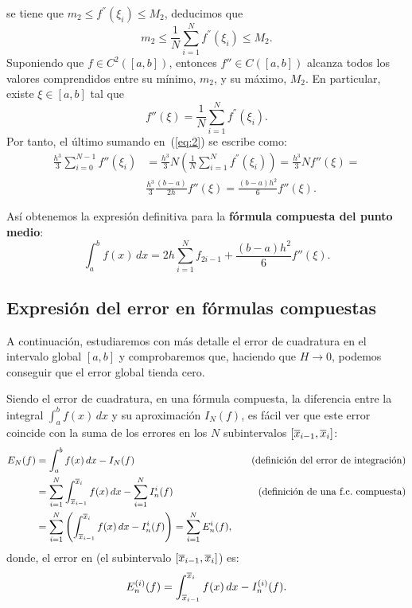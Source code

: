 \begin{example}
  se tiene que $m_2\le f^{''}(\xi_i)\le M_2$, deducimos que
  $$
  m_2 \le \frac 1N \sum_{i=1}^Nf^{''}(\xi_i) \le M_2.
  $$
  Suponiendo que $f\in C^2([a,b])$, entonces $f''\in C([a,b])$
  alcanza todos los valores comprendidos entre su mínimo, $m_2$,
  y su máximo, $M_2$. En particular, existe $\xi\in[a,b]$ tal que
  $$
  f''(\xi) = \frac 1N \sum_{i=1}^Nf^{''}(\xi_i).
  $$
  Por tanto, el último sumando en~(\ref{eq:2}) se escribe como:
  \begin{align*}
  \frac{h^3}{3} \sum_{i=0}^{N-1}f''(\xi_i) &= \frac{h^3}{3} N \left( \frac 1N
  \sum_{i=1}^Nf^{''}(\xi_i) \right)=
    \frac{h^3}{3}N
  f''(\xi)=
    \\
    &
    \frac{h^3}{3} \frac{(b-a)}{2h} f''(\xi)
  =\frac{(b-a)h^2}{6} f''(\xi).
  \end{align*}

  Así obtenemos la expresión definitiva para la \textbf{fórmula compuesta del
  punto medio}:
  \begin{equation*}
    \int_a^b f(x)\,dx
    = 2h \sum_{i=1}^{N} f_{2i-1} + \frac{(b-a)h^2}{6} f''(\xi).
  \end{equation*}
\end{example}


\subsection*{Expresión del error en fórmulas compuestas}
A continuación, estudiaremos con más detalle el error de cuadratura en
el intervalo global $[a,b]$ y comprobaremos que, haciendo que
$H\to 0$, podemos conseguir que el error global tienda cero.


Siendo el error de cuadratura, en una fórmula compuesta, la diferencia
entre la integral $\int_a^b f(x)\,dx$ y su aproximación $I_N(f)$, es
fácil ver que este error coincide con la suma de los errores en los
$N$ subintervalos $[\overline x_{i-1},\overline x_i]$:
\begin{alignat*}{2}
  E_N(f)&= \int_a^b f(x)\,dx - I_N(f)
  &\quad \text{(definición del error de integración)}
  \\
  &= \sum_{i=1}^N \int_{\overline x_{i-1}}^{\overline x_i} f(x)\,dx -
  \sum_{i=1}^NI_n^i(f)
  &\text{(definición de una f.c.\ compuesta)}
  \\
  &= \sum_{i=1}^N\left(
    \int_{\overline x_{i-1}}^{\overline x_i} f(x)\,dx -  I_n^i(f) \right)
  =\sum_{i=1}^N E_n^i(f),
\end{alignat*}
donde, el error en (el subintervalo $[\overline x_{i-1},\overline x_i]$) es:
\begin{equation}
  \label{eq:fc.compuesta.error.subintervalos}
  E_n^{(i)}(f)=\int_{\overline x_{i-1}}^{\overline x_i} f(x)\,dx -  I_n^{(i)}(f).
\end{equation}

